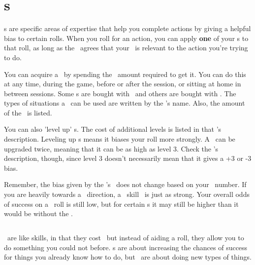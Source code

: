 
\section{\skillC s}

\par
\skillC s are specific areas of expertise that help you complete actions by giving a helpful bias to certain rolls. When you roll for an action, you can apply \textbf{one} of your \skill s to that roll, as long as the \gm\, agrees that your \skill\, is relevant to the action you're trying to do.

\par
You can acquire a \skill\, by spending the \xp\, amount required to get it. You can do this at any time, during the game, before or after the session, or sitting at home in between sessions. Some \skill s are bought with \feelingsxp\, and others are bought with \lasersxp . The types of situations a \skill\, can be used are written by the \skill 's name. Also, the amount of the \modifier\, is listed.

\par
You can also 'level up' \skill s. The cost of additional levels is listed in that \skill 's description. Leveling up \skill s means it biases your roll more strongly. A \skill\, can be upgraded twice, meaning that it can be as high as level 3. Check the \skill 's description, though, since level 3 doesn't necessarily mean that it gives a +3 or -3 bias.

\par
Remember, the bias given by the \skill 's \modifier\, does not change based on your \both\, number. If you are heavily towards a \feelings\, direction, a \lasers\, skill \modifier\, is just as strong. Your overall odds of success on a \lasers\, roll is still low, but for certain \skill s it may still be higher than it would be without the \skill .

\subsection{\abilityPC}
\abilityPC\, are like skills, in that they cost \xp\, but instead of aiding a roll, they allow you to do something you could not before. \skillC s are about increasing the chances of success for things you already know how to do, but \abilityP\, are about doing new types of things.